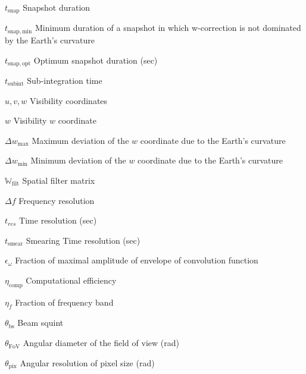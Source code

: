 \documentclass[11pt,a4paper]{article}
\newcommand{\snapshot}{t_\mathrm{snap}} %
\newcommand{\minsnapshot}{t_\mathrm{snap,min}} %
\newcommand{\optsnapshot}{t_\mathrm{snap,opt}} %
\newcommand{\subint}{t_\mathrm{subint}} %
\newcommand{\uvw}{u,v,w} %
\newcommand{\w}{w} %
\newcommand{\maxwdev}{\Delta w_\mathrm{max}} %
\newcommand{\minwdev}{\Delta w_\mathrm{min}} %
\newcommand{\spfiltm}{\mathbb{W}_\mathrm{filt}} %
\newcommand{\fres}{\Delta f} %
\newcommand{\tressmear}{t_\mathrm{smear}} %
\newcommand{\tres}{t_{res}} %
\newcommand{\fracconvfuncamp}{\epsilon_\omega} %
\newcommand{\compeff}{\eta_\mathrm{comp}} %
\newcommand{\fracfband}{\eta_f} %
\newcommand{\beamsq}{\theta_\mathrm{bs}} %
\newcommand{\fovdiam}{\theta_\mathrm{FoV}} %
\newcommand{\pixres}{\theta_\mathrm{pix}} %
\begin{document}
\begin{basedescript}{\desclabelstyle{\pushlabel}\desclabelwidth{6em}}
\item[$\snapshot$] Snapshot duration \vspace{-0.2cm}
\item[$\minsnapshot$] Minimum duration of a snapshot in which w-correction is
  not dominated by the Earth's curvature \vspace{-0.2cm}
\item[$\optsnapshot$] Optimum snapshot duration (sec) \vspace{-0.2cm}
\item[$\subint$] Sub-integration time\vspace{-0.2cm}
\item[$\uvw$] Visibility coordinates \vspace{-0.2cm}
\item [$\w$] Visibility $w$ coordinate \vspace{-0.2cm}
\item[$\maxwdev$] Maximum deviation of the $w$ coordinate due to the Earth's
  curvature \vspace{-0.2cm}
\item[$\minwdev$] Minimum deviation of the $w$ coordinate due to the Earth's
  curvature \vspace{-0.2cm}
\item[$\spfiltm$] Spatial filter matrix \vspace{-0.2cm}
\item[$\fres$] Frequency resolution \vspace{-0.2cm}
\item[$\tres$] Time resolution (sec) \vspace{-0.2cm}
\item[$\tressmear$]  Smearing Time resolution (sec)  \vspace{-0.2cm}
\item[$\fracconvfuncamp$] Fraction of maximal amplitude of envelope of
  convolution function \vspace{-0.2cm}
\item[$\compeff$] Computational efficiency \vspace{-0.2cm}
\item[$\fracfband$] Fraction of frequency band \vspace{-0.2cm}
\item[$\beamsq$] Beam squint \vspace{-0.2cm}
\item[$\fovdiam$] Angular diameter of the field of view (rad) \vspace{-0.2cm}
\item[$\pixres$] Angular resolution of pixel size (rad) \vspace{-0.2cm}

\end{basedescript}
\end{document}
